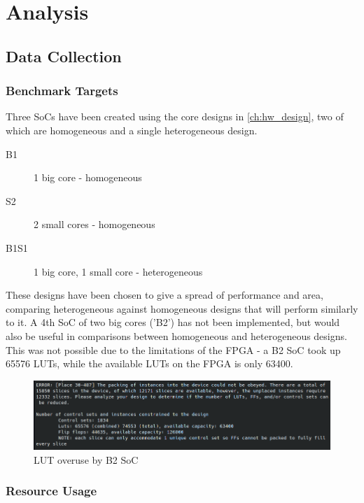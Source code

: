 \chapter{Analysis}
\label{ch:analysis}
\section{Data Collection}
\subsection{Benchmark Targets} %
Three SoCs have been created using the core designs in \ref{ch:hw_design}, two of which are homogeneous and a single heterogeneous design.

\begin{description}
    \item[B1] 1 big core - homogeneous
    \item[S2] 2 small cores - homogeneous
    \item[B1S1] 1 big core, 1 small core - heterogeneous
\end{description}

These designs have been chosen to give a spread of performance and area, comparing heterogeneous against homogeneous designs that will perform similarly to it. A 4th SoC of two big cores ('B2') has not been implemented, but would also be useful in comparisons between homogeneous and heterogeneous designs. This was not possible due to the limitations of the FPGA - a B2 SoC took up 65576 LUTs, while the available LUTs on the FPGA is only 63400.

\begin{figure}[h!]
    \centering
    \includegraphics*[width=\textwidth]{img/B2_lut_overuse.png}
    \caption{LUT overuse by B2 SoC}
    \label{fig:B2_lut_overuse}
\end{figure}

\subsection{Resource Usage} %
